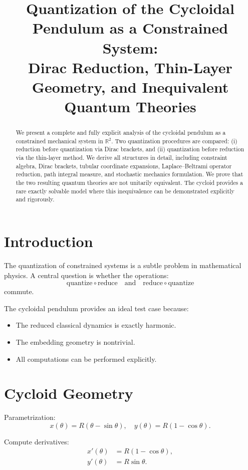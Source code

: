 \documentclass[11pt]{article}
\title{Quantization of the Cycloidal Pendulum as a Constrained System:\\
Dirac Reduction, Thin-Layer Geometry, and Inequivalent Quantum Theories}
\author{}
\date{}
\begin{document}
\maketitle

\begin{abstract}
We present a complete and fully explicit analysis of the cycloidal pendulum as a constrained mechanical system in $\mathbb{R}^2$. Two quantization procedures are compared: (i) reduction before quantization via Dirac brackets, and (ii) quantization before reduction via the thin-layer method. We derive all structures in detail, including constraint algebra, Dirac brackets, tubular coordinate expansions, Laplace–Beltrami operator reduction, path integral measure, and stochastic mechanics formulation. We prove that the two resulting quantum theories are not unitarily equivalent. The cycloid provides a rare exactly solvable model where this inequivalence can be demonstrated explicitly and rigorously.
\end{abstract}

\tableofcontents

\section{Introduction}

The quantization of constrained systems is a subtle problem in mathematical physics. A central question is whether the operations:
\[
\text{quantize} \circ \text{reduce}
\quad \text{and} \quad
\text{reduce} \circ \text{quantize}
\]
commute.

The cycloidal pendulum provides an ideal test case because:
\begin{itemize}
\item The reduced classical dynamics is exactly harmonic.
\item The embedding geometry is nontrivial.
\item All computations can be performed explicitly.
\end{itemize}

\section{Cycloid Geometry}

Parametrization:
\begin{equation}
x(\theta)=R(\theta-\sin\theta), \quad
y(\theta)=R(1-\cos\theta).
\end{equation}

Compute derivatives:
\begin{align}
x'(\theta) &= R(1-\cos\theta),\\
y'(\theta) &= R\sin\theta.
\end{align}
\end{document}
